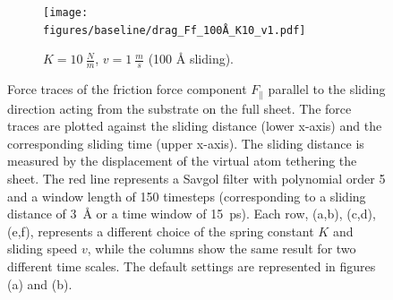 \begin{figure}[H]
    \hfill
    \begin{subfigure}[t]{0.49\textwidth}
      \centering
      \texttt{[image: figures/baseline/drag\_Ff\_100Å\_K10\_v1.pdf]}
      \caption{$K = \SI{10}{\frac{N}{m}}$, $v = \SI{1}{\frac{m}{s}}$ (100 Å sliding).}
      \label{fig:drag_Ff_100_K10_v1}
  \end{subfigure}
  \hfill
     \caption{Force traces of the friction force component $F_\parallel$ parallel to the sliding direction acting from the substrate on the full sheet. The force traces are plotted against the sliding distance (lower x-axis) and the corresponding sliding time (upper x-axis). The sliding distance is measured by the displacement of the virtual atom tethering the sheet. The red line represents a Savgol filter with polynomial order 5 and a window length of 150 timesteps (corresponding to a sliding distance of \SI{3}{Å} or a time window of \SI{15}{ps}). Each row, (a,b), (c,d), (e,f), represents a different choice of the spring constant $K$ and sliding speed $v$, while the columns show the same result for two different time scales. The default settings are represented in figures (a) and (b).}
     \label{fig:drag_Ff}
\end{figure}

